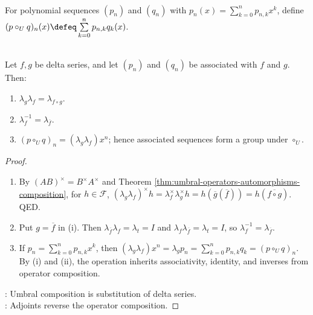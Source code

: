 \begin{definition} \label{def:umbral-composition-associated-sequences} \\
For polynomial sequences $(p_n)$ and $(q_n)$ with $p_n(x)=\sum_{k=0}^{n}p_{n,k}x^k$, define $(p\circ_U q)_n(x)\defeq\sum\limits_{k=0}^{n}p_{n,k}q_k(x)$.
\end{definition}

\begin{theorem} \label{thm:umbral-operators-group-law} \\
Let $f,g$ be delta series, and let $(p_n)$ and $(q_n)$ be associated with $f$ and $g$. Then:
\begin{enumerate}[label=(\roman*)]
\setlength{\itemsep}{0pt}
\item $\lambda_g\lambda_f=\lambda_{f\circ g}$.
\item $\lambda_f^{-1}=\lambda_{\overline f}$.
\item $(p\circ_U q)_n=(\lambda_g\lambda_f)x^n$; hence associated sequences form a group under $\circ_U$.
\end{enumerate}
\begin{proof}
\begin{enumerate}[label=(\roman*)]
\setlength{\itemsep}{0pt}
\item By $(AB)^\times=B^\times A^\times$ and Theorem \ref{thm:umbral-operators-automorphisms-composition}, for $h\in\mathscr{F}$, $(\lambda_g\lambda_f)^\times h=\lambda_f^\times\lambda_g^\times h=h(\overline g(\overline f))=h(\overline{f\circ g})$. QED.
\item Put $g=\overline f$ in (i). Then $\lambda_{\overline f}\lambda_f=\lambda_t=I$ and $\lambda_f\lambda_{\overline f}=\lambda_t=I$, so $\lambda_f^{-1}=\lambda_{\overline f}$.
\item If $p_n=\sum\limits_{k=0}^{n}p_{n,k}x^k$, then $(\lambda_g\lambda_f)x^n=\lambda_gp_n=\sum\limits_{k=0}^{n}p_{n,k}q_k=(p\circ_U q)_n$.\\
By (i) and (ii), the operation inherits associativity, identity, and inverses from operator composition.
\end{enumerate}
: Umbral composition is substitution of delta series.\\
: Adjoints reverse the operator composition.
\end{proof}
\end{theorem}

